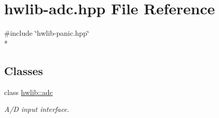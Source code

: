 \hypertarget{hwlib-adc_8hpp}{}\section{hwlib-\/adc.hpp File Reference}
\label{hwlib-adc_8hpp}
{\ttfamily \#include \char`\"{}hwlib-\/panic.\+hpp\char`\"{}}\\*
\subsection*{Classes}
\begin{DoxyCompactItemize}
\item 
class \hyperlink{classhwlib_1_1adc}{hwlib\+::adc}
\begin{DoxyCompactList}\small\item\em A/D input interface. \end{DoxyCompactList}\end{DoxyCompactItemize}
